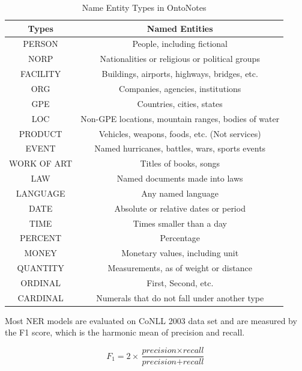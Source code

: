\begin{table}[]
\centering
\caption{Name Entity Types in OntoNotes}
\label{table:ontonotes-type}
\begin{tabular}{|c|c|} \hline
Types  & Named Entities  \\ \hline
PERSON & People, including fictional \\ \hline
NORP & Nationalities or religious or political groups \\\hline
FACILITY & Buildings, airports, highways, bridges, etc. \\ \hline
ORG & Companies, agencies, institutions \\ \hline
GPE & Countries, cities, states \\ \hline
LOC & Non-GPE locations, mountain ranges, bodies of water \\ \hline
PRODUCT & Vehicles, weapons, foods, etc. (Not services) \\ \hline
EVENT & Named hurricanes, battles, wars, sports events \\ \hline
WORK OF ART & Titles of books, songs \\ \hline
LAW & Named documents made into laws \\ \hline
LANGUAGE & Any named language  \\ \hline
DATE & Absolute or relative dates or period \\ \hline
TIME & Times smaller than a day  \\ \hline 
PERCENT & Percentage \\ \hline
MONEY & Monetary values, including unit \\ \hline
QUANTITY & Measurements, as of weight or distance \\ \hline
ORDINAL & First, Second, etc. \\ \hline
CARDINAL & Numerals that do not fall under another type \\ \hline
\end{tabular}
\end{table}

Most NER models are evaluated on CoNLL 2003 data set and are measured by the F1 score, which is the harmonic mean of precision and recall. 

\begin{equation}\label{eqn:softmax}
F_{1} = 2\times \dfrac{\textit{precision} \times \textit{recall}}{\textit{precision} + \textit{recall}}
\end{equation}

